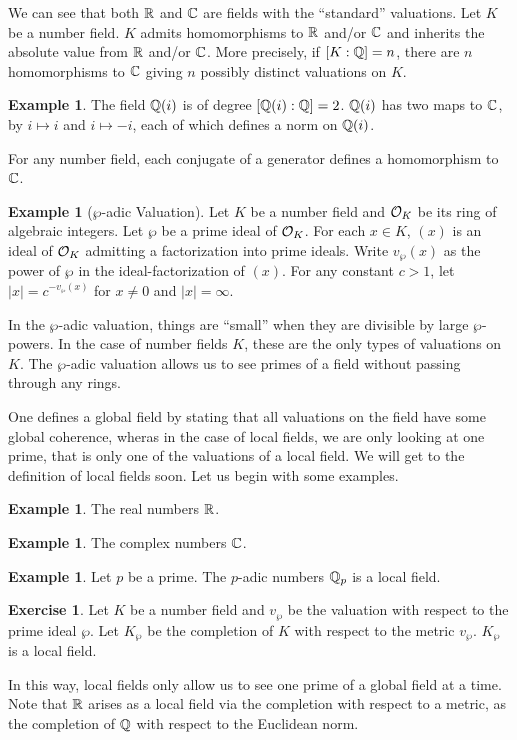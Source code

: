 \documentclass{amsart}
\theoremstyle{definition}
\newtheorem{exercise}[theorem]{Exercise}
\newtheorem{example}[theorem]{Example}
\numberwithin{equation}{section}
\begin{document}
We can see that both $\mathbb{R}$ and $\mathbb{C}$ are fields with the ``standard'' valuations. Let $K$ be a number field. $K$ admits homomorphisms to $\mathbb{R}$ and/or $\mathbb{C}$ and inherits the absolute value from $\mathbb{R}$ and/or $\mathbb{C}$. More precisely, if $[K:\mathbb{Q}]=n$, there are $n$ homomorphisms to $\mathbb{C}$ giving $n$ possibly distinct valuations on $K$. 
\begin{example}
  The field $\mathbb{Q}(i)$ is of degree $[\mathbb{Q}(i):\mathbb{Q}]=2$. $\mathbb{Q}(i)$ has two maps to $\mathbb{C}$, by $i\mapsto i$ and $i\mapsto -i$, each of which defines a norm on $\mathbb{Q}(i)$. 
\end{example}
For any number field, each conjugate of a generator defines a homomorphism to $\mathbb{C}$. 
\begin{example}[$\wp$-adic Valuation]
  Let $K$ be a number field and $\mathcal{O}_{K}$ be its ring of algebraic integers. Let $\wp$ be a prime ideal of $\mathcal{O}_{K}$. For each $x\in K$, $(x)$ is an ideal of $\mathcal{O}_{K}$ admitting a factorization into prime ideals. Write $v_{\wp}(x)$ as the power of $\wp$ in the ideal-factorization of $(x)$. For any constant $c>1$, let $|x|=c^{-v_{\wp}(x)}$ for $x\neq0$ and $|x|=\infty$. 
\end{example}
In the $\wp$-adic valuation, things are ``small'' when they are divisible by large $\wp$-powers. In the case of number fields $K$, these are the only types of valuations on $K$. The $\wp$-adic valuation allows us to see primes of a field without passing through any rings. 

One defines a global field by stating that all valuations on the field have some global coherence, wheras in the case of local fields, we are only looking at one prime, that is only one of the valuations of a local field. We will get to the definition of local fields soon. Let us begin with some examples. 
\begin{example}
  The real numbers $\mathbb{R}$. 
\end{example}
\begin{example}
  The complex numbers $\mathbb{C}$. 
\end{example}
\begin{example}
  Let $p$ be a prime. The $p$-adic numbers $\mathbb{Q}_{p}$ is a local field. 
\end{example}
\begin{exercise}
  Let $K$ be a number field and $v_{\wp}$ be the valuation with respect to the prime ideal $\wp$. Let $K_{\wp}$ be the completion of $K$ with respect to the metric $v_{\wp}$. $K_{\wp}$ is a local field. 
\end{exercise}
In this way, local fields only allow us to see one prime of a global field at a time. Note that $\mathbb{R}$ arises as a local field via the completion with respect to a metric, as the completion of $\mathbb{Q}$ with respect to the Euclidean norm. 
\end{document}
